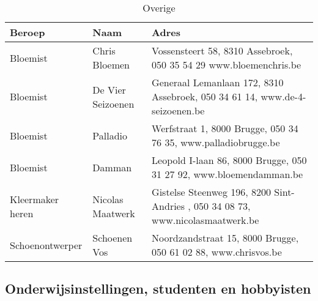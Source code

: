 \begin{longtabu} to \textwidth {XXX}
\caption{Overige}\label{table:makers-overige}\\ \hline
\textbf{Beroep} & \textbf{Naam} & \textbf{Adres} \\ \hline
Bloemist & Chris Bloemen & Vossensteert 58, 8310 Assebroek, 050 35 54 29 www.bloemenchris.be \\ \hline
Bloemist & De Vier Seizoenen & Generaal Lemanlaan 172, 8310 Assebroek, 050 34 61 14, www.de-4-seizoenen.be \\ \hline
Bloemist & Palladio & Werfstraat 1, 8000 Brugge, 050 34 76 35, www.palladiobrugge.be \\ \hline
Bloemist & Damman & Leopold I-laan 86, 8000 Brugge, 050 31 27 92, www.bloemendamman.be \\ \hline
Kleermaker heren & Nicolas Maatwerk & Gistelse Steenweg 196, 8200 Sint-Andries , 050 34 08 73, www.nicolasmaatwerk.be \\ \hline
Schoenontwerper & Schoenen Vos & Noordzandstraat 15, 8000 Brugge, 050 61 02 88, www.chrisvos.be
\end{longtabu}

\subsection{Onderwijsinstellingen, studenten en hobbyisten} %
\label{sub:onderwijsinstellingen_studenten_en_hobbyisten}


